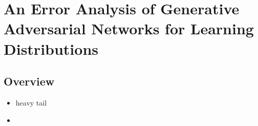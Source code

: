 
\chapter{An Error Analysis of Generative Adversarial Networks for
Learning Distributions}
\section*{Overview}


\begin{itemize}
    \item heavy tail 
    \item 
\end{itemize}